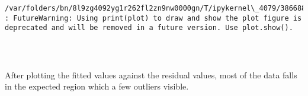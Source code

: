 \documentclass[11pt]{article}
\begin{document}
    \begin{Verbatim}[commandchars=\\\{\}]
/var/folders/bn/8l9zg4092yg1r262fl2zn9nw0000gn/T/ipykernel\_4079/3866888096.py:15
: FutureWarning: Using print(plot) to draw and show the plot figure is
deprecated and will be removed in a future version. Use plot.show().
    \end{Verbatim}

    \begin{center}
    \end{center}
    { \hspace*{\fill} \\}
    
    \begin{Verbatim}[commandchars=\\\{\}]

    \end{Verbatim}

    After plotting the fitted values against the residual values, most of
the data falls in the expected region which a few outliers visible.
\end{document}
